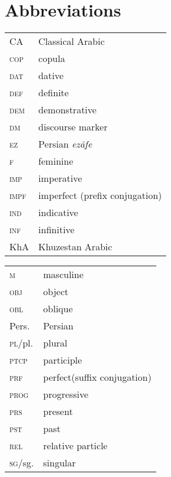 \documentclass[output=paper,nonflat]{langsci/langscibook}
\begin{document}
\section*{Abbreviations}

\begin{tabularx}{.5\textwidth}{@{}lQ@{}}
CA & Classical Arabic\\
\textsc{cop} & copula\\
\textsc{dat} & dative\\
\textsc{def} & definite\\
\textsc{dem} & demonstrative\\
\textsc{dm} & discourse marker\\
\textsc{ez} & Persian \textit{ezāfe}\\
\textsc{f} & feminine\\
\textsc{imp} & imperative\\
\textsc{impf} & imperfect (prefix conjugation)\\
\textsc{ind} & indicative\\
\textsc{inf} & infinitive\\
KhA & Khuzestan Arabic\\
\end{tabularx}%
\begin{tabularx}{.5\textwidth}{@{}lQ@{}}
\textsc{m} & masculine\\
\textsc{obj} & object\\
\textsc{obl} & oblique\\
Pers. & Persian\\
\textsc{pl}/pl. & plural\\
\textsc{ptcp} & participle\\
\textsc{prf} & perfect(suffix conjugation)\\
\textsc{prog} & progressive\\
\textsc{prs} & present\\
\textsc{pst} & past\\
\textsc{rel} & relative particle\\
\textsc{sg}/sg. & singular\\
\end{tabularx}%




\sloppy\printbibliography[heading=subbibliography,notkeyword=this]
\end{document}
